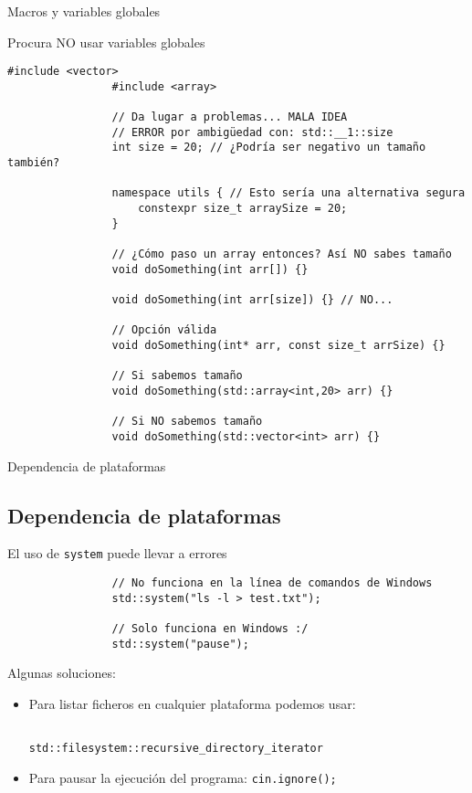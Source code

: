 \documentclass{beamer}
\newcommand{\normalSizeItem}[1] {
  \normalsize{\item #1}
}
\begin{document}
		\begin{frame}[fragile]{Macros y variables globales}	
			\begin{itemize}
			
				\normalSizeItem{Procura NO usar variables globales}
				\begin{lstlisting}[basicstyle={\tiny\ttfamily}]
				#include <vector>
				#include <array>
				
				// Da lugar a problemas... MALA IDEA
				// ERROR por ambigüedad con: std::__1::size
				int size = 20; // ¿Podría ser negativo un tamaño también?
				
				namespace utils { // Esto sería una alternativa segura
					constexpr size_t arraySize = 20;
				}
				
				// ¿Cómo paso un array entonces? Así NO sabes tamaño
				void doSomething(int arr[]) {}
				
				void doSomething(int arr[size]) {} // NO...
				
				// Opción válida
				void doSomething(int* arr, const size_t arrSize) {}
				
				// Si sabemos tamaño
				void doSomething(std::array<int,20> arr) {}
				
				// Si NO sabemos tamaño
				void doSomething(std::vector<int> arr) {}
				\end{lstlisting}
				
			\end{itemize}
		\end{frame}
		
		\begin{frame}[fragile]{Dependencia de plataformas}	
			\subsection{Dependencia de plataformas}		
			\begin{itemize}

				\normalSizeItem { El uso de \texttt{system} puede llevar a errores}
				\begin{lstlisting}
				// No funciona en la línea de comandos de Windows
				std::system("ls -l > test.txt");
				
				// Solo funciona en Windows :/
				std::system("pause"); 
				\end{lstlisting}
				
				\item { 
					
					Algunas soluciones: 
								
					\begin{itemize}
						\item {
							Para listar ficheros en cualquier plataforma podemos usar:
							 \begin{verbatim}
							 	std::filesystem::recursive_directory_iterator
							 \end{verbatim}
						}
						\item {
							Para pausar la ejecución del programa: \texttt{cin.ignore();}
						}
					\end{itemize}
				}
			\end{itemize}
		\end{frame}
		
\end{document}
